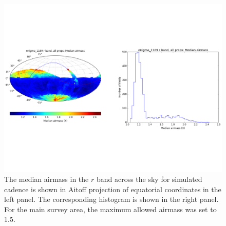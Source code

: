 
\begin{figure}[tbh!]
\vskip -1.3in
\includegraphics[angle=0,width=0.99\hsize:,clip]{figs/enigma1189_airmass.pdf}
\vskip -1.3in
\caption{The median airmass in the $r$ band across the sky for simulated cadence
 is shown in Aitoff
projection of equatorial coordinates in the left panel. The corresponding histogram is
shown in the right panel. For the main survey area, the maximum allowed airmass
was set to 1.5. }
\label{fig:airmassenigma}
\end{figure}

